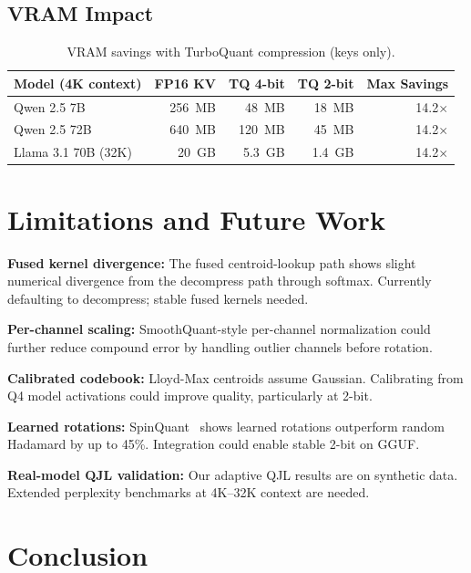 \documentclass[11pt]{article}
\begin{document}
\subsection{VRAM Impact}

\begin{table}[h]
\centering
\caption{VRAM savings with TurboQuant compression (keys only).}
\label{tab:vram}
\begin{tabular}{@{}lrrrr@{}}
\toprule
Model (4K context) & FP16 KV & TQ 4-bit & TQ 2-bit & Max Savings \\
\midrule
Qwen 2.5 7B & 256~MB & 48~MB & 18~MB & 14.2$\times$ \\
Qwen 2.5 72B & 640~MB & 120~MB & 45~MB & 14.2$\times$ \\
Llama 3.1 70B (32K) & 20~GB & 5.3~GB & 1.4~GB & 14.2$\times$ \\
\bottomrule
\end{tabular}
\end{table}

\section{Limitations and Future Work}

\textbf{Fused kernel divergence:} The fused centroid-lookup path shows slight numerical divergence from the decompress path through softmax. Currently defaulting to decompress; stable fused kernels needed.

\textbf{Per-channel scaling:} SmoothQuant-style per-channel normalization could further reduce compound error by handling outlier channels before rotation.

\textbf{Calibrated codebook:} Lloyd-Max centroids assume Gaussian. Calibrating from Q4 model activations could improve quality, particularly at 2-bit.

\textbf{Learned rotations:} SpinQuant~\citep{spinquant} shows learned rotations outperform random Hadamard by up to 45\%. Integration could enable stable 2-bit on GGUF.

\textbf{Real-model QJL validation:} Our adaptive QJL results are on synthetic data. Extended perplexity benchmarks at 4K--32K context are needed.

\section{Conclusion}
\end{document}
